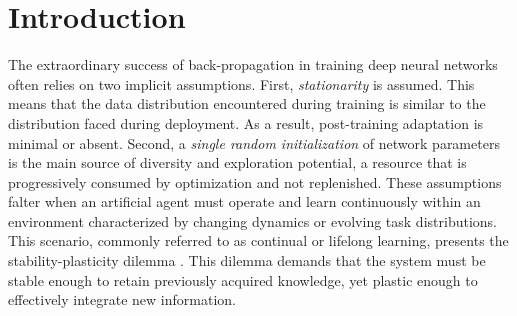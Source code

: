 \documentclass{article}
\numberwithin{figure}{section}
\begin{document}
\begin{abstract}
\end{abstract}
\section{Introduction}
The extraordinary success of back-propagation in training deep neural networks often relies on two implicit assumptions. First, \emph{stationarity} is assumed. This means that the data distribution encountered during training is similar to the distribution faced during deployment. As a result, post-training adaptation is minimal or absent. Second, a \emph{single random initialization} of network parameters is the main source of diversity and exploration potential, a resource that is progressively consumed by optimization and not replenished. These assumptions falter when an artificial agent must operate and learn continuously within an environment characterized by changing dynamics or evolving task distributions. This scenario, commonly referred to as continual or lifelong learning, presents the stability-plasticity dilemma \citep{abraham2005memory, chaudhry2018riemannian}. This dilemma demands that the system must be stable enough to retain previously acquired knowledge, yet plastic enough to effectively integrate new information.
\end{document}
